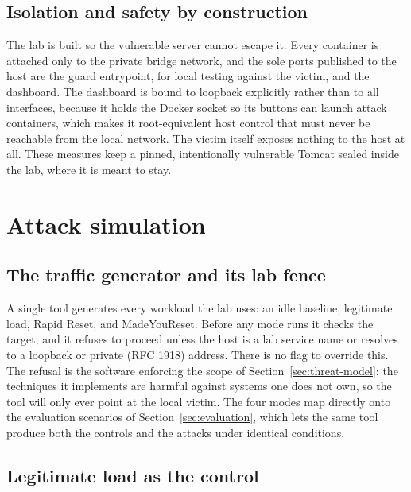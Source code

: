 \documentclass[a4paper,fleqn]{cas-dc}
\begin{document}
\subsection{Isolation and safety by construction}\label{sec:isolation}

The lab is built so the vulnerable server cannot escape it. Every container is attached only to the private bridge network, and the sole ports published to the host are the guard entrypoint, for local testing against the victim, and the dashboard. The dashboard is bound to loopback explicitly rather than to all interfaces, because it holds the Docker socket so its buttons can launch attack containers, which makes it root-equivalent host control that must never be reachable from the local network. The victim itself exposes nothing to the host at all. These measures keep a pinned, intentionally vulnerable Tomcat sealed inside the lab, where it is meant to stay.

\section{Attack simulation}\label{sec:attacks}

\subsection{The traffic generator and its lab fence}\label{sec:generator}

A single tool generates every workload the lab uses: an idle baseline, legitimate load, Rapid Reset, and MadeYouReset. Before any mode runs it checks the target, and it refuses to proceed unless the host is a lab service name or resolves to a loopback or private (RFC 1918) address. There is no flag to override this. The refusal is the software enforcing the scope of Section~\ref{sec:threat-model}: the techniques it implements are harmful against systems one does not own, so the tool will only ever point at the local victim. The four modes map directly onto the evaluation scenarios of Section~\ref{sec:evaluation}, which lets the same tool produce both the controls and the attacks under identical conditions.

\subsection{Legitimate load as the control}\label{sec:legit}
\end{document}
